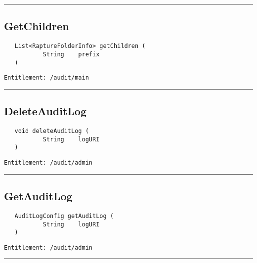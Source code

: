 \rule{12cm}{2pt}
\subsection{GetChildren}
\label{Api:GetChildren}
\begin{verbatim}
   List<RaptureFolderInfo> getChildren (
           String    prefix
   )
\end{verbatim}
\begin{Verbatim}[fontsize=\small, formatcom=\color{Maroon}]
  Entitlement: /audit/main
\end{Verbatim}



\rule{12cm}{2pt}
\subsection{DeleteAuditLog}
\label{Api:DeleteAuditLog}
\begin{verbatim}
   void deleteAuditLog (
           String    logURI
   )
\end{verbatim}
\begin{Verbatim}[fontsize=\small, formatcom=\color{Maroon}]
  Entitlement: /audit/admin
\end{Verbatim}



\rule{12cm}{2pt}
\subsection{GetAuditLog}
\label{Api:GetAuditLog}
\begin{verbatim}
   AuditLogConfig getAuditLog (
           String    logURI
   )
\end{verbatim}
\begin{Verbatim}[fontsize=\small, formatcom=\color{Maroon}]
  Entitlement: /audit/admin
\end{Verbatim}



\rule{12cm}{2pt}
